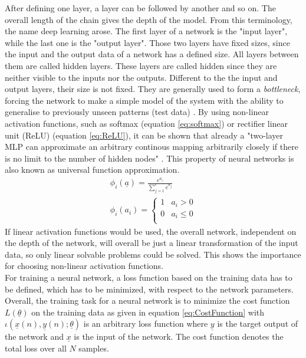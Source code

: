 \documentclass[12pt,DIV14,BCOR12mm,a4paper,footexclude,headinclude,halfparskip-,twoside,openright,openany,cleardoubleempty,idxtotoc,bibtotoc]{scrreprt} %
\numberwithin{equation}{chapter}
\begin{document}
After defining one layer, a layer can be followed by another and so on. The overall length of the chain gives the depth of the model. From this terminology, the name deep learning arose. The first layer of a network is the "input layer", while the last one is the "output layer". Those two layers have fixed sizes, since the input and the output data of a network has a defined size. All layers between them are called hidden layers. These layers are called hidden since they are neither visible to the inputs nor the outputs. Different to the the input and output layers, their size is not fixed. They are generally used to form a \textit{bottleneck}, forcing the network to make a simple model of the system with the ability to generalise to previously unseen patterns (test data) \cite{Michie-et-al-1994}. By using non-linear activation functions, such as softmax (equation \ref{eq:softmax}) or rectifier linear unit (ReLU) (equation \ref{eq:ReLU}), it can be shown that already a "two-layer MLP can approximate an arbitrary continous mapping arbitrarily closely if there is no limit to the number of hidden nodes" \cite{Michie-et-al-1994}. This property of neural networks is also known as universal function approximation.
\begin{align}
	\phi_{i}(\underline{a}) = \frac{e^{a_{i}}}{\sum_{j=1}^{c}e^{a_{j}}} \label{eq:softmax}\\
	\phi_{i}(a_{i}) = \begin{cases} 1 & a_{i} > 0\\0 & a_{i} \leq 0\\ \end{cases} \label{eq:ReLU}
\end{align}
If linear activation functions would be used, the overall network, independent on the depth of the network, will overall be just a linear transformation of the input data, so only linear solvable problems could be solved. This shows the importance for choosing non-linear activation functions.\\
For training a neural network, a loss function based on the training data has to be defined, which has to be minimized, with respect to the network parameters. 
Overall, the training task for a neural network is to minimize the cost function $L(\underline{\theta})$ on the training data as given in equation \ref{eq:CostFunction} with $\iota(\underline{x}(n),\underline{y}(n);\underline{\theta})$ is an arbitrary loss function where $\underline{y}$ is the target output of the network and $\underline{x}$ is the input of the network. The cost function denotes the total loss over all $N$ samples.
\end{document}
